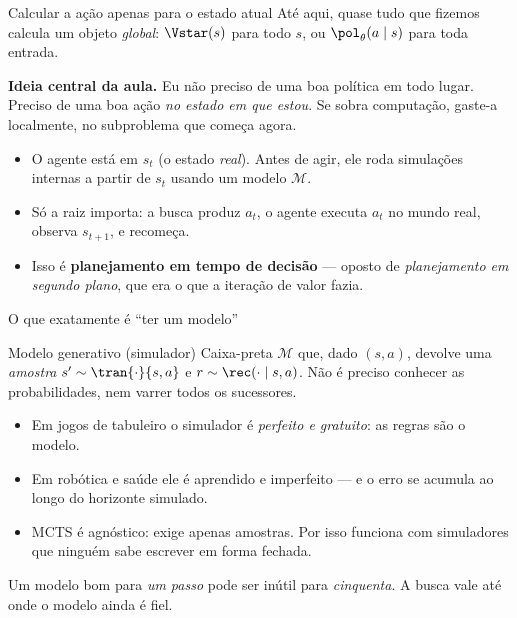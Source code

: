 \documentclass[aspectratio=169, 11pt]{beamer}
\newcommand{\Mmod}{\mathcal{M}}                 %
\begin{document}
\begin{frame}{Calcular a ação apenas para o estado atual}
  Até aqui, quase tudo que fizemos calcula um objeto \emph{global}:
  $\Vstar(s)$ para todo $s$, ou $\pol_\theta(a\mid s)$ para toda entrada.

  \pause
  \begin{ideiabox}
    \textbf{Ideia central da aula.} Eu não preciso de uma boa política em
    todo lugar. Preciso de uma boa ação \emph{no estado em que estou}.
    Se sobra computação, gaste-a localmente, no subproblema que começa agora.
  \end{ideiabox}

  \pause
  \begin{itemize}
    \item O agente está em $s_t$ (o estado \emph{real}). Antes de agir, ele roda
          simulações internas a partir de $s_t$ usando um modelo $\Mmod$.
    \item Só a raiz importa: a busca produz $a_t$, o agente executa $a_t$ no
          mundo real, observa $s_{t+1}$, e recomeça.
    \item Isso é \textbf{planejamento em tempo de decisão} --- oposto de
          \emph{planejamento em segundo plano}, que era o que a iteração
          de valor fazia.
  \end{itemize}
\end{frame}

\begin{frame}{O que exatamente é ``ter um modelo''}
  \begin{defbox}{Modelo generativo (simulador)}
    Caixa-preta $\Mmod$ que, dado $(s,a)$, devolve uma \emph{amostra}
    $s' \sim \tran{\cdot}{s,a}$ e $r \sim \rec(\cdot\mid s,a)$. Não é preciso
    conhecer as probabilidades, nem varrer todos os sucessores.
  \end{defbox}

  \pause
  \begin{itemize}
    \item Em jogos de tabuleiro o simulador é \emph{perfeito e gratuito}:
          as regras são o modelo.
    \item Em robótica e saúde ele é aprendido e imperfeito --- e o erro se
          acumula ao longo do horizonte simulado.
    \item MCTS é agnóstico: exige apenas amostras. Por isso funciona com
          simuladores que ninguém sabe escrever em forma fechada.
  \end{itemize}

  \pause
  \begin{alertabox}
    Um modelo bom para \emph{um passo} pode ser inútil para \emph{cinquenta}.
    A busca vale até onde o modelo ainda é fiel.
  \end{alertabox}
\end{frame}
\end{document}
